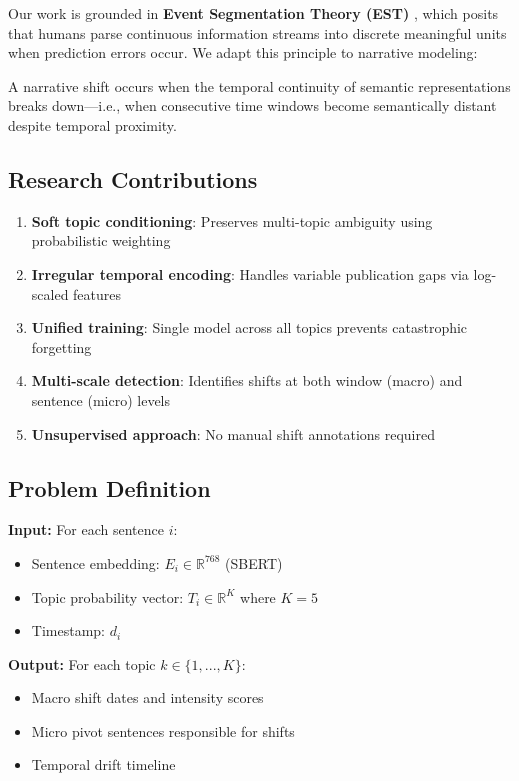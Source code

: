 \documentclass[12pt]{article}
\begin{document}
Our work is grounded in \textbf{Event Segmentation Theory (EST)} \citep{zacks2007event}, which posits that humans parse continuous information streams into discrete meaningful units when prediction errors occur. We adapt this principle to narrative modeling:

\begin{tcolorbox}[colback=blue!5!white, colframe=blue!75!black, title=Core Insight]
A narrative shift occurs when the temporal continuity of semantic representations breaks down—i.e., when consecutive time windows become semantically distant despite temporal proximity.
\end{tcolorbox}

\subsection{Research Contributions}

\begin{enumerate}
    \item \textbf{Soft topic conditioning}: Preserves multi-topic ambiguity using probabilistic weighting
    \item \textbf{Irregular temporal encoding}: Handles variable publication gaps via log-scaled features
    \item \textbf{Unified training}: Single model across all topics prevents catastrophic forgetting
    \item \textbf{Multi-scale detection}: Identifies shifts at both window (macro) and sentence (micro) levels
    \item \textbf{Unsupervised approach}: No manual shift annotations required
\end{enumerate}

\subsection{Problem Definition}

\textbf{Input:} For each sentence $i$:
\begin{itemize}
    \item Sentence embedding: $E_i \in \mathbb{R}^{768}$ (SBERT)
    \item Topic probability vector: $T_i \in \mathbb{R}^{K}$ where $K=5$
    \item Timestamp: $d_i$
\end{itemize}

\textbf{Output:} For each topic $k \in \{1, ..., K\}$:
\begin{itemize}
    \item Macro shift dates and intensity scores
    \item Micro pivot sentences responsible for shifts
    \item Temporal drift timeline
\end{itemize}
\end{document}
